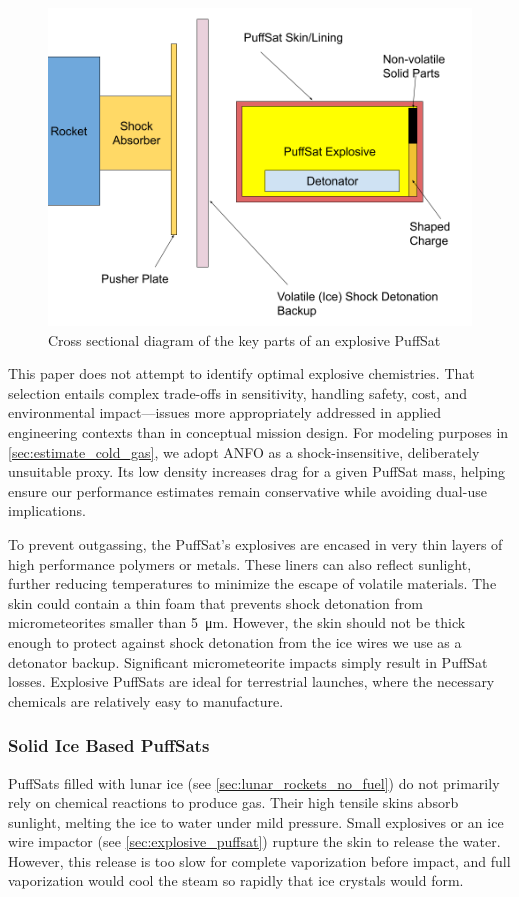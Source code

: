\documentclass{article}
\begin{document}
\begin{figure}
    \centering
    \includegraphics[width=0.5\linewidth]{images/Explosive PuffSat.png}
    \caption{Cross sectional diagram of the key parts of an explosive PuffSat}
    \label{fig:explosive_puffsat}
\end{figure}

This paper does not attempt to identify optimal explosive chemistries. That selection entails complex trade-offs in sensitivity, handling safety, cost, and environmental impact—issues more appropriately addressed in applied engineering contexts than in conceptual mission design. For modeling purposes in \autoref{sec:estimate_cold_gas}, we adopt ANFO \cite{wikipediaANFO} as a shock-insensitive, deliberately unsuitable proxy. Its low density increases drag for a given PuffSat mass, helping ensure our performance estimates remain conservative while avoiding dual-use implications.

To prevent outgassing, the PuffSat's explosives are encased in very thin layers of high performance polymers or metals. These liners can also reflect sunlight, further reducing temperatures to minimize the escape of volatile materials. The skin could contain a thin foam that prevents shock detonation from micrometeorites smaller than \SI{5}{\micro\meter}.  However, the skin should not be thick enough to protect against shock detonation from the ice wires we use as a detonator backup.  Significant micrometeorite impacts simply result in PuffSat losses.   Explosive PuffSats are ideal for terrestrial launches, where the necessary chemicals are relatively easy to manufacture.

\subsubsection{Solid Ice Based PuffSats} \label{sec:icy_puffsat}
PuffSats filled with lunar ice (see \autoref{sec:lunar_rockets_no_fuel}) do not primarily rely on chemical reactions to produce gas. Their high tensile skins absorb sunlight, melting the ice to water under mild pressure. Small explosives or an ice wire impactor (see \autoref{sec:explosive_puffsat}) rupture the skin to release the water. However, this release is too slow for complete vaporization before impact, and full vaporization would cool the steam so rapidly that ice crystals would form.
\end{document}
